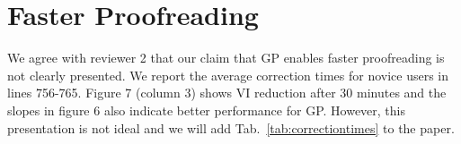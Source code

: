 \documentclass[10pt,twocolumn,letterpaper]{article}
\begin{document}
\begin{table}[h]
\caption{Training data of membrane detection vs. training data of GP (for supplemental material).}%
\label{tab:trainingdata}
\end{table}


\section{Faster Proofreading}
We agree with reviewer 2 that our claim that GP enables faster proofreading is not clearly presented. We report the average correction times for novice users in lines 756-765. Figure 7 (column 3) shows VI reduction after 30 minutes and the slopes in figure 6 also indicate better performance for GP. However, this presentation is not ideal and we will add Tab.~\ref{tab:correctiontimes} to the paper.


\begin{table}[h]
\caption{Average proofreading speed for novice users of Dojo, FP and GP. Higher VI reduction per minute shows better performance of GP.}%
\label{tab:correctiontimes}
\end{table}
\end{document}
